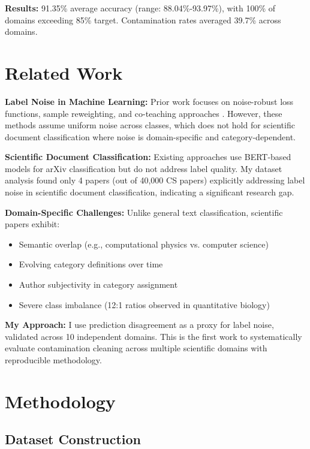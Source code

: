 \documentclass{article}
\begin{document}
\textbf{Results:} 91.35\% average accuracy (range: 88.04\%-93.97\%), with 100\% of domains exceeding 85\% target. Contamination rates averaged 39.7\% across domains.

\section{Related Work}

\textbf{Label Noise in Machine Learning:} Prior work focuses on noise-robust loss functions, sample reweighting, and co-teaching approaches \cite{han2018co, zhang2018generalized}. However, these methods assume uniform noise across classes, which does not hold for scientific document classification where noise is domain-specific and category-dependent.

\textbf{Scientific Document Classification:} Existing approaches use BERT-based models for arXiv classification \cite{beltagy2019scibert} but do not address label quality. My dataset analysis found only 4 papers (out of 40,000 CS papers) explicitly addressing label noise in scientific document classification, indicating a significant research gap.

\textbf{Domain-Specific Challenges:} Unlike general text classification, scientific papers exhibit:
\begin{itemize}
    \item Semantic overlap (e.g., computational physics vs. computer science)
    \item Evolving category definitions over time
    \item Author subjectivity in category assignment
    \item Severe class imbalance (12:1 ratios observed in quantitative biology)
\end{itemize}

\textbf{My Approach:} I use prediction disagreement as a proxy for label noise, validated across 10 independent domains. This is the first work to systematically evaluate contamination cleaning across multiple scientific domains with reproducible methodology.

\section{Methodology}

\subsection{Dataset Construction}
\end{document}
